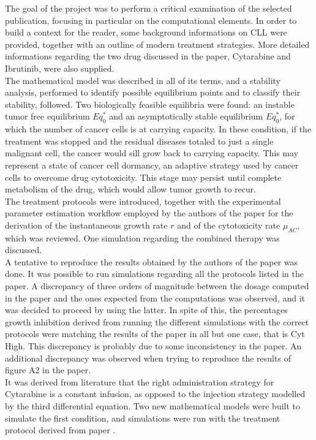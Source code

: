 The goal of the project was to perform a critical examination of the selected publication, focusing in particular on the computational elements. In order to build a context for the reader, some background informations on CLL were provided, together with an outline of modern treatment strategies. More detailed informations regarding the two drug discussed in the paper, Cytarabine and Ibrutinib, were also supplied. \\
The mathematical model was described in all of its terms, and a stability analysis, performed to identify possible equilibrium points and to classify their stability, followed. Two biologically feasible equilibria were found: an instable tumor free equilibrium $Eq_{0}^{*}$ and an asymptotically stable equilibrium $Eq_{0}^{*}$, for which the number of cancer cells is at carrying capacity. In these condition, if the treatment was stopped and the residual diseases totaled to just a single malignant cell, the cancer would sill grow back to carrying capacity. This may represent a state of cancer cell dormancy, an adaptive strategy used by cancer cells to overcome drug cytotoxicity. This stage may persist until complete metabolism of the drug, which would allow tumor growth to recur. \\
The treatment protocols were introduced, together with the experimental parameter estimation workflow employed by the authors of the paper for the derivation of the instantaneous growth rate $r$ and of the cytotoxicity rate $\mu_{AC}$, which was reviewed. One simulation regarding the combined therapy was discussed. \\
A tentative to reproduce the results obtained by the authors of the paper was done. It was possible to run simulations regarding all the protocols listed in the paper. A discrepancy of three orders of magnitude between the dosage computed in the paper and the ones expected from the computations was observed, and it was decided to proceed by using the latter. In spite of this, the percentages growth inhibition derived from running the different simulations with the correct protocols were matching the results of the paper in all but one case, that is Cyt High. This discrepancy is probably due to some inconsistency in the paper. An additional discrepancy was observed when trying to reproduce the results of figure A2 in the paper. \\ 
It was derived from literature that the right administration strategy for Cytarabine is a constant infusion, as opposed to the injection strategy modelled by the third differential equation. Two new mathematical models were built to simulate the first condition, and simulations were run with the treatment protocol derived from paper \cite{cyt-3}. \\
